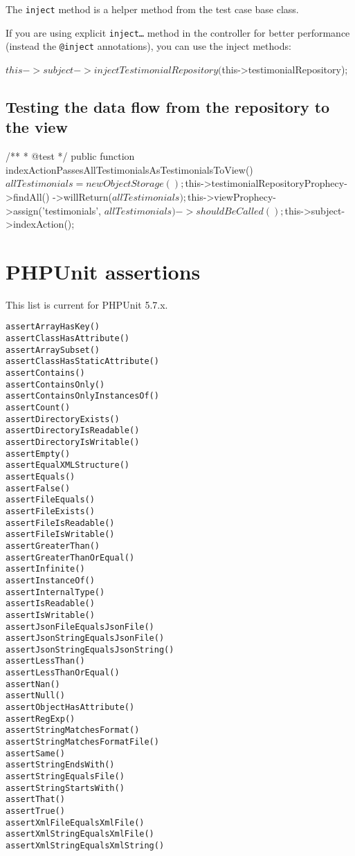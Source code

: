 \documentclass[a4paper,11pt,headsepline]{scrartcl}
\begin{document}
The \texttt{inject} method is a helper method from the test case base class.

If you are using explicit \texttt{inject…} method in the controller for better performance (instead the \texttt{@inject} annotations), you can use the inject methods:

\begin{phpcode}
$this->subject->injectTestimonialRepository($this->testimonialRepository);
\end{phpcode}


\subsection{Testing the data flow from the repository to the view}

\begin{phpcode}
/**
  * @test
  */
public function indexActionPassesAllTestimonialsAsTestimonialsToView()
{
    $allTestimonials = new ObjectStorage();
    $this->testimonialRepositoryProphecy->findAll()
        ->willReturn($allTestimonials);

    $this->viewProphecy->assign('testimonials', $allTestimonials)
        ->shouldBeCalled();

    $this->subject->indexAction();
}
\end{phpcode}





\pagebreak
\section{PHPUnit assertions}
This list is current for PHPUnit 5.7.x.

\begin{verbatim}
assertArrayHasKey()
assertClassHasAttribute()
assertArraySubset()
assertClassHasStaticAttribute()
assertContains()
assertContainsOnly()
assertContainsOnlyInstancesOf()
assertCount()
assertDirectoryExists()
assertDirectoryIsReadable()
assertDirectoryIsWritable()
assertEmpty()
assertEqualXMLStructure()
assertEquals()
assertFalse()
assertFileEquals()
assertFileExists()
assertFileIsReadable()
assertFileIsWritable()
assertGreaterThan()
assertGreaterThanOrEqual()
assertInfinite()
assertInstanceOf()
assertInternalType()
assertIsReadable()
assertIsWritable()
assertJsonFileEqualsJsonFile()
assertJsonStringEqualsJsonFile()
assertJsonStringEqualsJsonString()
assertLessThan()
assertLessThanOrEqual()
assertNan()
assertNull()
assertObjectHasAttribute()
assertRegExp()
assertStringMatchesFormat()
assertStringMatchesFormatFile()
assertSame()
assertStringEndsWith()
assertStringEqualsFile()
assertStringStartsWith()
assertThat()
assertTrue()
assertXmlFileEqualsXmlFile()
assertXmlStringEqualsXmlFile()
assertXmlStringEqualsXmlString()
\end{verbatim}
\end{document}
